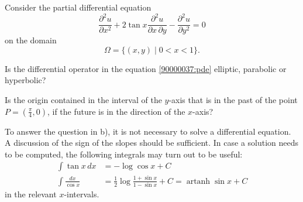 Consider the partial differential equation
\begin{equation}
\frac{\partial^2 u}{\partial x^2}
+
2\tan x
\frac{\partial^2 u}{\partial x\,\partial y}
-
\frac{\partial^2 u}{\partial y^2}
=
0
\label{90000037:pde}
\end{equation}
on the domain
\begin{equation}
\Omega
=
\{
(x,y)
\mid
0<x<1
\}.
\end{equation}
\begin{teilaufgaben}
\item
Is the differential operator in the equation \eqref{90000037:pde}
elliptic, parabolic or hyperbolic?
\item
Is the origin contained in the interval of the $y$-axis that is in the past
of the point $P=(\frac{\pi}4,0)$, if the future is in the direction
of the $x$-axis?
\end{teilaufgaben}

\begin{hinweis}
To answer the question in b), it is not necessary to solve a differential
equation.
A discussion of the sign of the slopes should be sufficient.
In case a solution needs to be computed,
the following integrals may turn out to be useful:
\begin{align*}
\int \tan x\,dx &= -\log\cos x + C
\\
\int \frac{dx}{\cos x} &= \frac12\log\frac{1+\sin x}{1-\sin x} + C
=
\operatorname{artanh}\sin x + C
\end{align*}
in the relevant $x$-intervals.
\end{hinweis}

